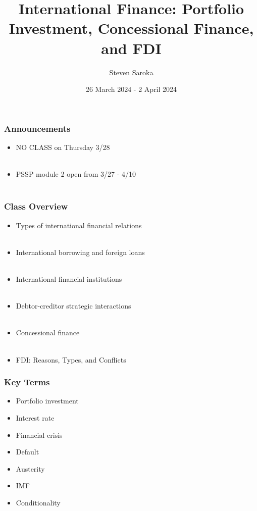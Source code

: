\documentclass{beamer}
\title[International Finance]{\LARGE{International Finance: Portfolio Investment, Concessional Finance, and FDI}}
\author[POLI 150]{Steven Saroka}
\institute{POLI 150}
\date{26 March 2024 - 2 April 2024}
\begin{document}
\begin{frame}
\titlepage %
\end{frame}



\begin{frame} 
	\frametitle{\LARGE{Announcements}}
	\begin{itemize}
		
		\item NO CLASS on Thursday 3/28 
		\\~\\ 
		\item PSSP module 2 open from 3/27 - 4/10 
		\\~\\
		
		
	\end{itemize}
\end{frame}

\begin{frame} 
	\frametitle{\LARGE{Class Overview}}
	\begin{itemize}
		
			\item Types of international financial relations 
			\\~\\ 
			\item International borrowing and foreign loans 
			\\~\\
			\item International financial institutions
			\\~\\
			\item Debtor-creditor strategic interactions
			\\~\\
			\item Concessional finance
			\\~\\
			\item FDI: Reasons, Types, and Conflicts 
	
	\end{itemize}
\end{frame}

\begin{frame} 
	\frametitle{\LARGE{Key Terms}}
	\begin{itemize}
		\item Portfolio investment
		\item Interest rate
		\item Financial crisis
		\item Default
		\item Austerity
		\item IMF
		\item Conditionality
	\end{itemize}
\end{frame}
\end{document}
